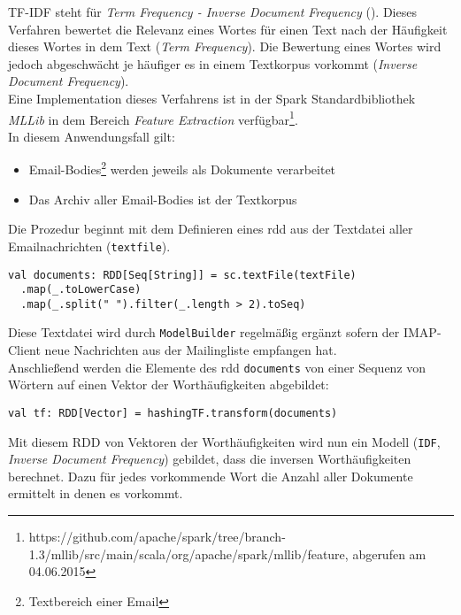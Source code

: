 TF-IDF steht für \textit{Term Frequency - Inverse Document Frequency} (\cite{SparckJones:1988:SIT:106765.106782}). Dieses Verfahren bewertet die Relevanz eines Wortes für einen Text nach der Häufigkeit dieses Wortes in dem Text (\textit{Term Frequency}). Die Bewertung eines Wortes wird jedoch abgeschwächt je häufiger es in einem Textkorpus vorkommt (\textit{Inverse Document Frequency}).\\

Eine Implementation dieses Verfahrens ist in der Spark Standardbibliothek \textit{MLLib} in dem Bereich \textit{Feature Extraction} verfügbar\footnote{https://github.com/apache/spark/tree/branch-1.3/mllib/src/main/scala/org/apache/spark/mllib/feature, abgerufen am 04.06.2015}.\\

In diesem Anwendungsfall gilt:
\begin{itemize}
\item Email-Bodies\footnote{Textbereich einer Email} werden jeweils als Dokumente verarbeitet
\item Das Archiv aller Email-Bodies ist der Textkorpus
\end{itemize}

Die Prozedur beginnt mit dem Definieren eines \gls{rdd} aus der Textdatei aller Emailnachrichten (\lstinline|textfile|).\\

\begin{lstlisting}
val documents: RDD[Seq[String]] = sc.textFile(textFile)
  .map(_.toLowerCase)
  .map(_.split(" ").filter(_.length > 2).toSeq)
\end{lstlisting}

Diese Textdatei wird durch \lstinline|ModelBuilder| regelmäßig ergänzt sofern der IMAP-Client neue Nachrichten aus der Mailingliste empfangen hat.\\

Anschließend werden die Elemente des \gls{rdd} \lstinline|documents| von einer Sequenz von Wörtern auf einen Vektor der Worthäufigkeiten abgebildet:

\begin{lstlisting}
val tf: RDD[Vector] = hashingTF.transform(documents)
\end{lstlisting}

Mit diesem RDD von Vektoren der Worthäufigkeiten wird nun ein Modell (\lstinline|IDF|, \textit{Inverse Document Frequency}) gebildet, dass die inversen Worthäufigkeiten berechnet. Dazu für jedes vorkommende Wort die Anzahl aller Dokumente ermittelt in denen es vorkommt.\\


